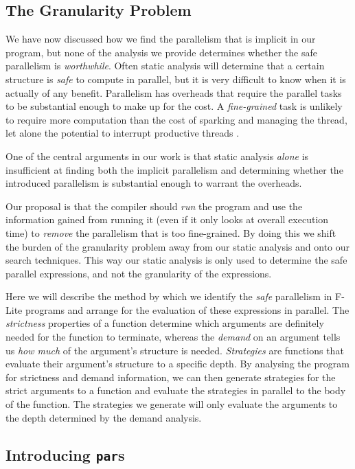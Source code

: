 \subsection{The Granularity Problem}

We have now discussed how we find the parallelism that is implicit in our
program, but none of the analysis we provide determines whether the safe
parallelism is \emph{worthwhile}. Often static analysis will determine that a
certain structure is \emph{safe} to compute in parallel, but it is very
difficult to know when it is actually of any benefit. Parallelism has overheads
that require the parallel tasks to be substantial enough to make up for the
cost. A \emph{fine-grained} task is unlikely to require more computation than
the cost of sparking and managing the thread, let alone the potential to
interrupt productive threads \citep{hammond2000research, hogen1992automatic}.

One of the central arguments in our work is that static analysis \emph{alone}
is insufficient at finding both the implicit parallelism and determining whether
the introduced parallelism is substantial enough to warrant the overheads.

Our proposal is that the compiler should \emph{run} the program and use the
information gained from running it (even if it only looks at overall execution
time) to \emph{remove} the parallelism that is too fine-grained. By doing this
we shift the burden of the granularity problem away from our static analysis
and onto our search techniques. This way our static analysis is only used to
determine the safe parallel expressions, and not the granularity of the
expressions.

Here we will describe the method by which we identify the \emph{safe}
parallelism in F-Lite programs and arrange for the evaluation of these
expressions in parallel. The \emph{strictness} properties of a function
determine which arguments are definitely needed for the function to terminate,
whereas the \emph{demand} on an argument tells us \emph{how much} of the
argument's structure is needed. \emph{Strategies} are functions that evaluate
their argument's structure to a specific depth. By analysing the program for
strictness and demand information, we can then generate strategies for the
strict arguments to a function and evaluate the strategies in parallel to the
body of the function. The strategies we generate will only evaluate the
arguments to the depth determined by the demand analysis.

\subsection{Introducing \texttt{par}s}
\label{sec:introPar}

